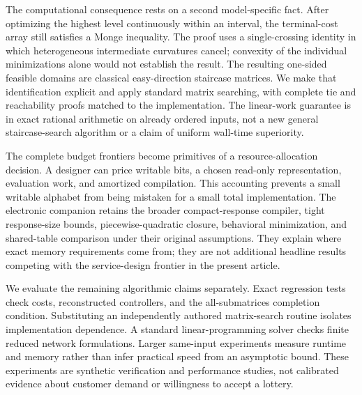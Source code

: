 The computational consequence rests on a second model-specific fact. After optimizing the highest level continuously within an interval, the terminal-cost array still satisfies a Monge inequality. The proof uses a single-crossing identity in which heterogeneous intermediate curvatures cancel; convexity of the individual minimizations alone would not establish the result. The resulting one-sided feasible domains are classical easy-direction staircase matrices. We make that identification explicit and apply standard matrix searching, with complete tie and reachability proofs matched to the implementation. The linear-work guarantee is in exact rational arithmetic on already ordered inputs, not a new general staircase-search algorithm or a claim of uniform wall-time superiority.

The complete budget frontiers become primitives of a resource-allocation decision. A designer can price writable bits, a chosen read-only representation, evaluation work, and amortized compilation. This accounting prevents a small writable alphabet from being mistaken for a small total implementation. The electronic companion retains the broader compact-response compiler, tight response-size bounds, piecewise-quadratic closure, behavioral minimization, and shared-table comparison under their original assumptions. They explain where exact memory requirements come from; they are not additional headline results competing with the service-design frontier in the present article.

We evaluate the remaining algorithmic claims separately. Exact regression tests check costs, reconstructed controllers, and the all-submatrices completion condition. Substituting an independently authored matrix-search routine isolates implementation dependence. A standard linear-programming solver checks finite reduced network formulations. Larger same-input experiments measure runtime and memory rather than infer practical speed from an asymptotic bound. These experiments are synthetic verification and performance studies, not calibrated evidence about customer demand or willingness to accept a lottery.
